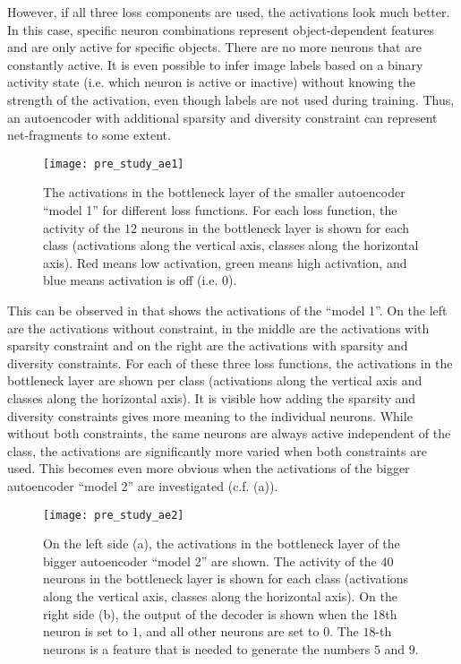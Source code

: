 However, if all three loss components are used, the activations look much better. In this case, specific neuron combinations represent object-dependent features and are only active for specific objects. There are no more neurons that are constantly active. It is even possible to infer image labels based on a binary activity state (i.e. which neuron is active or inactive) without knowing the strength of the activation, even though labels are not used during training. Thus, an autoencoder with additional sparsity and diversity constraint can represent net-fragments to some extent.


\begin{figure}[h]
    \centering
    \texttt{[image: pre\_study\_ae1]}
    \caption[Network activations of the smaller autoencoder network on the straight line dataset]{The activations in the bottleneck layer of the smaller autoencoder ``model 1'' for different loss functions. For each loss function, the activity of the $12$ neurons in the bottleneck layer is shown for each class (activations along the vertical axis, classes along the horizontal axis). Red means low activation, green means high activation, and blue means activation is off (i.e. $0$).}
\end{figure}

This can be observed in  that shows the activations of the ``model 1''.
On the left are the activations without constraint, in the middle are the activations with sparsity constraint and on the right are the activations with sparsity and diversity constraints.
For each of these three loss functions, the activations in the bottleneck layer are shown per class (activations along the vertical axis and classes along the horizontal axis).
It is visible how adding the sparsity and diversity constraints gives more meaning to the individual neurons. While without both constraints, the same neurons are always active independent of the class, the activations are significantly more varied when both constraints are used.
This becomes even more obvious when the activations of the bigger autoencoder ``model 2'' are investigated (c.f.  (a)).

\begin{figure}[h]
    \centering
    \texttt{[image: pre\_study\_ae2]}
    \caption[Network activations of the bigger autoencoder network on the straight line dataset]{On the left side (a), the activations in the bottleneck layer of the bigger autoencoder ``model 2'' are shown. The activity of the $40$ neurons in the bottleneck layer is shown for each class (activations along the vertical axis, classes along the horizontal axis). On the right side (b), the output of the decoder is shown when the 18th neuron is set to $1$, and all other neurons are set to $0$. The $18$-th neurons is a feature that is needed to generate the numbers $5$ and $9$.}
\end{figure}

